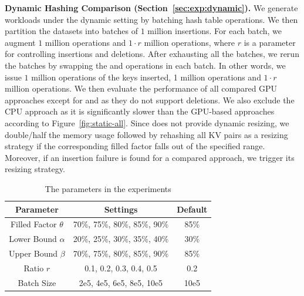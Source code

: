

\vspace{1mm}\noindent\textbf{Dynamic Hashing Comparison (Section~\ref{sec:exp:dynamic}).}
We generate workloads under the dynamic setting by batching hash table operations.
We then partition the datasets into batches of $1$ million insertions. 
For each batch, we augment $1$ million  operations and $1 \cdot r$ million  operations,
where $r$ is a parameter for controlling insertions and deletions.
After exhausting all the batches, we rerun the batches by swapping the  and  operations in each batch. 
In other words, we issue $1$ million  operations of the keys inserted, 1 million  operations and $1 \cdot r$ million  operations.
We then evaluate the performance of all compared GPU approaches except for \cudpp and \warp as they do not support deletions. 
We also exclude the CPU approach as it is significantly slower than the GPU-based approaches according to Figure~\ref{fig:static-all}. 
Since \megakv does not provide dynamic resizing, we double/half the memory usage followed by rehashing all KV pairs as a resizing strategy if the corresponding filled factor falls out of the specified range. 
Moreover, if an insertion failure is found for a compared approach, we trigger its resizing strategy.

\begin{table}[t]
	\centering
	\caption{The parameters in the experiments}
	\vspace{-1.5em}
	\label{tbl:parameters}
	\begin{tabular}{|c|c|c|}
		\hline
		\textbf{Parameter} & \textbf{Settings} & \textbf{Default} \\ \hline
		Filled Factor	$\theta$  & 70\%, 75\%, 80\%, 85\%, 90\% & 85\% \\ \hline
		Lower Bound $\alpha$ & 20\%, 25\%, 30\%, 35\%, 40\% & 30\% \\ \hline
		Upper Bound	$\beta$  & 70\%, 75\%, 80\%, 85\%, 90\% & 85\% \\ \hline
		Ratio $r$ & 0.1, 0.2, 0.3, 0.4, 0.5 & 0.2 \\ \hline
		Batch Size & 2e5, 4e5, 6e5, 8e5, 10e5 & 10e5 \\ \hline
	\end{tabular}
\end{table}


